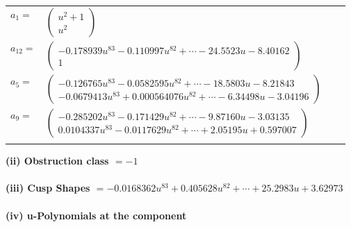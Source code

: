 \documentclass[1p]{elsarticle_modified}
\theoremstyle{definition}
\begin{document}
\begin{tabular}{m{7pt} m{180pt} m{7pt} m{180pt} }
\flushright $a_{1}=$&$\begin{pmatrix}u^2+1\\u^2\end{pmatrix}$ \\
\flushright $a_{12}=$&$\begin{pmatrix}-0.178939 u^{83}-0.110997 u^{82}+\cdots-24.5523 u-8.40162\\1\end{pmatrix}$ \\
\flushright $a_{5}=$&$\begin{pmatrix}-0.126765 u^{83}-0.0582595 u^{82}+\cdots-18.5803 u-8.21843\\-0.0679413 u^{83}+0.000564076 u^{82}+\cdots-6.34498 u-3.04196\end{pmatrix}$ \\
\flushright $a_{9}=$&$\begin{pmatrix}-0.285202 u^{83}-0.171429 u^{82}+\cdots-9.87160 u-3.03135\\0.0104337 u^{83}-0.0117629 u^{82}+\cdots+2.05195 u+0.597007\end{pmatrix}$\\&\end{tabular}
\flushleft \textbf{(ii) Obstruction class $= -1$}\\~\\
\flushleft \textbf{(iii) Cusp Shapes $= -0.0168362 u^{83}+0.405628 u^{82}+\cdots+25.2983 u+3.62973$}\\~\\
\newpage\renewcommand{\arraystretch}{1}
\flushleft \textbf{(iv) u-Polynomials at the component}\newline \\
\end{document}
